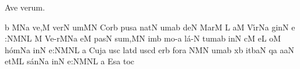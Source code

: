 \beginhymn Ave verum.


\Internote
\nosolesmescustos
\initiumgregorianum
\znotes\fissum{1pt}\bmolle b\en
%
\sgn {}{-}{}\punctum M\nonspatium\pes Na\egn
\sgn ve,\punctum M\egn
\spatium
\begingroup
\bgenerale
\sgn ver\punctum N\egn
\sgn {}um\punctum M\augmentum N\egn
\spatium\asteriscus\spatium
\sgn C{o}r\punctum b\egn
\sgn pus\punctum a\egn
\spatium
\sgn n{a}t\punctum N\egn
\sgn {}um\punctum a\augmentum b\egn
\spatium
\divisiominor
\spatium
\sgn de{}\punctum N\egn
\spatium
\sgn Mar\punctum M\egn
\sgn {}{\'\i}{-}\punctum L\egn
\sgn {}a{}\punctum M\egn
\spatium
\sgn V{\'\i}r\pes Na\egn
\sgn gin\punctum N\egn
\sgn {}e{ :}\clivis NM\augmentumduplex NL\egn
\spatium
\divisiofinalis
\spatium
\custos M
\lineaproxima
\sgn Ve{-r}\Salicus MNa\egn
\sgn {}e{}\punctum M\egn
\spatium
\sgn p{a}{s}\punctum N\egn
\sgn su{m,}\punctum M\augmentum N\egn
\spatium
\sgn {}im\punctum b\egn
\sgn mo{-}\punctum a\egn
\sgn l{\'a}{-}\punctum N\egn
\sgn tum\punctum a\augmentum b\egn
\spatium
\divisiominor
\spatium
\sgn {}in\punctum N\egn
\spatium
{}c\punctum M\egn
\sgn {}e{}\punctum L\egn
\spatium
{}o{}\punctum M\egn
\spatium
\sgn h{\'o}m\pes Na\egn
\sgn {}in\punctum N\egn
\sgn {}e:\clivis NM\augmentumduplex NL\egn
\spatium
\divisiofinalis
\spatium
\custos a
\lineaproxima
\sgn C{u}j\punctum a\egn
\sgn {}us\punctum c\egn
\spatium
\sgn l{a}{t}\punctum d\egn
\sgn {}us\punctum c\augmentum d\egn
\spatium
{}er\punctum b\egn
\sgn for\punctum a\egn
{}\porrectus NMN\egn
\sgn {}um\punctum a\augmentum b\egn
\spatium
\divisiominor
\spatium
x\punctum b\egn
\sgn {}it\climacus baN\egn
\spatium
{}q\punctum a\egn
{}a{}\clivis aN\egn
\spatium
\sgn {}et\clivis ML\egn
\spatium
\sgn s{\'a}n\pes Na\egn
{}in\punctum N\egn
\sgn {}e:\clivis NM\augmentumduplex NL\egn
\spatium
\divisiofinalis
\spatium
\custos a
\lineaproxima
\sgn {}E{s}\punctum a\egn
\sgn to{}\punctum c\egn
\spatium
